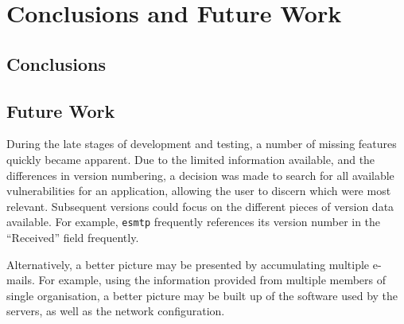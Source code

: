 \chapter{Conclusions and Future Work}\label{chap:conc}
\section{Conclusions}

\section{Future Work}

During the late stages of development and testing, a number of missing features quickly became apparent. Due to the limited information available, and the differences in version numbering, a decision was made to search for all available vulnerabilities for an application, allowing the user to discern which were most relevant.  Subsequent versions could focus on the different pieces of version data available.  For example, \texttt{esmtp} frequently references its version number in the ``Received'' field frequently.

Alternatively, a better picture may be presented by accumulating multiple e-mails. For example, using the information provided from multiple members of single organisation, a better picture may be built up of the software used by the servers, as well as the network configuration.
